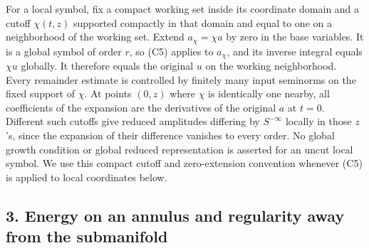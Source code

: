 \documentclass[
  11pt,
]{article}
\makeatletter
\let\ReaderOriginalAnchorStart\hyper@anchorstart
\let\ReaderOriginalAnchorEnd\hyper@anchorend
\let\ReaderPendingAliases\@empty
\def\ReaderArmAliases#1{\gdef\ReaderPendingAliases{#1}}
\def\hyper@anchorstart#1{\ReaderIfNativeAnchorTF{#1}{\ReaderPendingAliases\global\let\ReaderPendingAliases\@empty}{}\ReaderOriginalAnchorStart{#1}}
\makeatother
\begin{document}
For a local symbol, fix a compact working set inside its coordinate
domain and a cutoff \(\chi(t,z)\) supported compactly in that domain and
equal to one on a neighborhood of the working set. Extend
\(a_\chi=\chi a\) by zero in the base variables. It is a global symbol
of order \(r\), so (C5) applies to \(a_\chi\), and its inverse integral
equals \(\chi u\) globally. It therefore equals the original \(u\) on
the working neighborhood. Every remainder estimate is controlled by
finitely many input seminorms on the fixed support of \(\chi\). At
points \((0,z)\) where \(\chi\) is identically one nearby, all
coefficients of the expansion are the derivatives of the original \(a\)
at \(t=0\). Different such cutoffs give reduced amplitudes differing by
\(S^{-\infty}\) locally in those \(z\)'s, since the expansion of their
difference vanishes to every order. No global growth condition or global
reduced representation is asserted for an uncut local symbol. We use
this compact cutoff and zero-extension convention whenever (C5) is
applied to local coordinates below.

\ReaderArmAliases{\ReaderOriginalAnchorStart{AN03-CN-003}\ReaderOriginalAnchorEnd\begingroup\expandafter\def\csname @currentHref\endcsname{AN03-CN-003}\label{AN03-CN-003}\endgroup\ReaderOriginalAnchorStart{an03-cn-003-energy-on-an-annulus-and-regularity-away-from-the-submanifold}\ReaderOriginalAnchorEnd\begingroup\expandafter\def\csname @currentHref\endcsname{an03-cn-003-energy-on-an-annulus-and-regularity-away-from-the-submanifold}\label{an03-cn-003-energy-on-an-annulus-and-regularity-away-from-the-submanifold}\endgroup\ReaderOriginalAnchorStart{3-energy-on-an-annulus-and-regularity-away-from-the-submanifold}\ReaderOriginalAnchorEnd\begingroup\expandafter\def\csname @currentHref\endcsname{3-energy-on-an-annulus-and-regularity-away-from-the-submanifold}\label{3-energy-on-an-annulus-and-regularity-away-from-the-submanifold}\endgroup\ReaderOriginalAnchorStart{energy-on-an-annulus-and-regularity-away-from-the-submanifold}\ReaderOriginalAnchorEnd}
\subsection{3. Energy on an annulus and regularity away from the
submanifold}\label{energy-on-an-annulus-and-regularity-away-from-the-submanifold}
\end{document}

